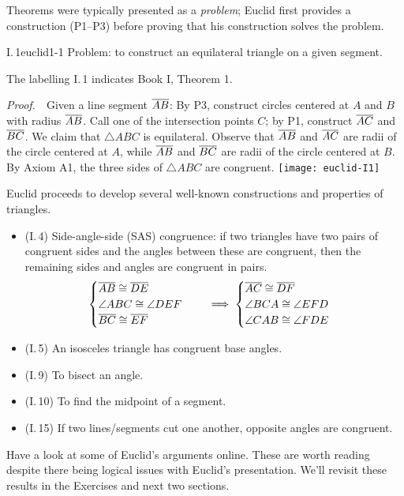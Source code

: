 
Theorems were typically presented as a \emph{problem}; Euclid first provides a construction (P1--P3) before proving that his construction solves the problem.

\begin{thm}{I.\,1}{euclid1-1}
	Problem: to construct an equilateral triangle on a given segment.
\end{thm}

The labelling I.\,1 indicates Book I, Theorem 1.

\begin{tcolorbox}[proofstyle, lower separated=false, sidebyside, sidebyside align=top seam, sidebyside gap=0pt, righthand width=0.35\linewidth]
	\emph{Proof.}\ \ Given a line segment $\overline{AB}$:\smallbreak
	By P3, construct circles centered at $A$ and $B$ with radius $\overline{AB}$.\smallbreak
	Call one of the intersection points $C$; by P1, construct $\overline{AC}$ and $\overline{BC}$.\smallbreak
	We claim that $\triangle ABC$ is equilateral.\medbreak
	Observe that $\overline{AB}$ and $\overline{AC}$ are radii of the circle centered at $A$, while $\overline{AB}$ and $\overline{BC}$ are radii of the circle centered at $B$. By Axiom A1, the three sides of $\triangle ABC$ are congruent.
	\tcblower
	\flushright\texttt{[image: euclid-I1]}\hfil\qedsymbol
\end{tcolorbox}


Euclid proceeds to develop several well-known constructions and properties of triangles.
\begin{itemize}\itemsep0pt
  \item (I.\,4) Side-angle-side (SAS) congruence: if two triangles have two pairs of congruent sides and the angles between these are congruent, then the remaining sides and angles are congruent in pairs.
  \[
  	\begin{cases}
		  \overline{AB}\cong\overline{DE}\\
		  \angle ABC\cong\angle DEF\\
		  \overline{BC}\cong\overline{EF}
 	 	\end{cases}
  	\quad\implies
  	\begin{cases}
		  \overline{AC}\cong\overline{DF}\\
		  \angle BCA\cong\angle EFD\\
		  \angle CAB\cong\angle FDE
  	\end{cases}
  \]
  \item (I.\,5) An isosceles triangle has congruent base angles.
  \item (I.\,9) To bisect an angle.
  \item (I.\,10) To find the midpoint of a segment.
  \item (I.\,15) If two lines/segments cut one another, opposite angles are congruent.
\end{itemize}
Have a look at some of Euclid's arguments online. These are worth reading despite there being logical issues with Euclid's presentation. We'll revisit these results in the Exercises and next two sections. 

